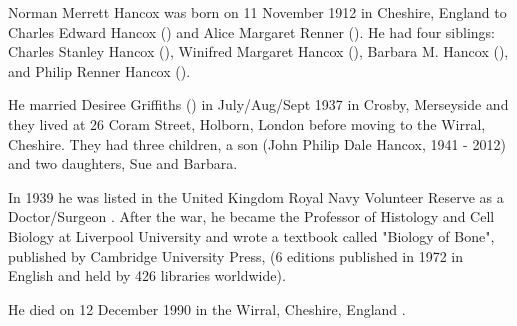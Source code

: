 
Norman Merrett Hancox was born on 11 November 1912 in Cheshire, England to Charles Edward Hancox () and Alice Margaret Renner (). He had four siblings:  Charles Stanley Hancox (),  Winifred Margaret Hancox (), Barbara M. Hancox (), and Philip Renner Hancox ().

He married Desiree Griffiths () in July/Aug/Sept 1937 in Crosby, Merseyside \cite{NMHancoxMarriage} and they lived at 26 Coram Street, Holborn, London \cite{NMHancoxResidence} before moving to the Wirral, Cheshire. They had three children, a son (John Philip Dale Hancox, 1941 - 2012) and two daughters, Sue and Barbara.

In 1939 he was listed in the United Kingdom Royal Navy Volunteer Reserve as a  Doctor/Surgeon \cite{NMHancoxWar}.  After the war, he became the Professor of Histology and Cell Biology at Liverpool University and wrote a textbook called "Biology of Bone", published by Cambridge University Press, (6 editions published in 1972 in English and held by 426 libraries worldwide)\cite{NMHancoxBook}.

He died on 12 December 1990 in the	Wirral, Cheshire, England \cite{NMHancoxDeath}.

